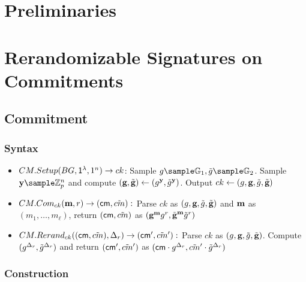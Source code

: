 \section{Preliminaries}\label{sec:preliminaries}


\section{Rerandomizable Signatures on Commitments}\label{sec:sigs}
\subsection{Commitment}
\subsubsection{Syntax}
\begin{itemize}
    \item $CM.Setup(BG, \mathsf{1^{\lambda}}, 1^n) \to ck$: Sample $g \sample \G_1, \tilg \sample \G_2$. Sample $\yb \sample \Z_p^{n}$ and compute $(\textbf{g}, \tilde{\textbf{g}}) \gets (g^{\textbf{y}}, \tilde{g}^{\textbf{y}})$. Output $ck \gets (g, \textbf{g}, \tilde{g}, \tilde{\textbf{g}})$
    
    \item $CM.Com_{ck}(\textbf{m}, r) \to (\mathsf{cm}, \tilde{cm}):$ Parse $ck$ as $(g, \textbf{g}, \tilde{g}, \tilde{\textbf{g}})$ and $\textbf{m}$ as $(m_1, \dots, m_{\ell})$, return $(\mathsf{cm}, \tilde{cm})$ as $(\textbf{g}^{\textbf{m}}g^r, \tilde{\textbf{g}}^{\textbf{m}}\tilde{g}^r)$

    \item $CM.Rerand_{ck}((\mathsf{cm}, \tilde{cm}), \Delta_r) \to (\mathsf{cm}', \tilde{cm}'):$ Parse $ck$ as $(g, \textbf{g}, \tilde{g}, \tilde{\textbf{g}})$. Compute $(g^{\Delta_r}, \tilde{g}^{\Delta_r})$ and return $(\mathsf{cm}', \tilde{cm}')$ as $(\mathsf{cm} \cdot g^{\Delta_r}, \tilde{cm}' \cdot \tilde{g}^{\Delta_r})$
\end{itemize}

\subsubsection{Construction}

